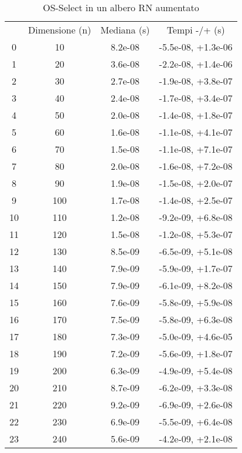 \begin{table}
\centering
\caption{OS-Select in un albero RN aumentato}
\label{OS-Select in un albero RN aumentato}
\begin{adjustbox}{width=1\textwidth/2}
\begin{tabular}{|c|c|c|c|}
\hline
 & Dimensione (n) & Mediana (s) & Tempi -/+ (s) \\
0 & 10 & 8.2e-08 & -5.5e-08, +1.3e-06 \\
\cline{1-4}
1 & 20 & 3.6e-08 & -2.2e-08, +1.4e-06 \\
\cline{1-4}
2 & 30 & 2.7e-08 & -1.9e-08, +3.8e-07 \\
\cline{1-4}
3 & 40 & 2.4e-08 & -1.7e-08, +3.4e-07 \\
\cline{1-4}
4 & 50 & 2.0e-08 & -1.4e-08, +1.8e-07 \\
\cline{1-4}
5 & 60 & 1.6e-08 & -1.1e-08, +4.1e-07 \\
\cline{1-4}
6 & 70 & 1.5e-08 & -1.1e-08, +7.1e-07 \\
\cline{1-4}
7 & 80 & 2.0e-08 & -1.6e-08, +7.2e-08 \\
\cline{1-4}
8 & 90 & 1.9e-08 & -1.5e-08, +2.0e-07 \\
\cline{1-4}
9 & 100 & 1.7e-08 & -1.4e-08, +2.5e-07 \\
\cline{1-4}
10 & 110 & 1.2e-08 & -9.2e-09, +6.8e-08 \\
\cline{1-4}
11 & 120 & 1.5e-08 & -1.2e-08, +5.3e-07 \\
\cline{1-4}
12 & 130 & 8.5e-09 & -6.5e-09, +5.1e-08 \\
\cline{1-4}
13 & 140 & 7.9e-09 & -5.9e-09, +1.7e-07 \\
\cline{1-4}
14 & 150 & 7.9e-09 & -6.1e-09, +8.2e-08 \\
\cline{1-4}
15 & 160 & 7.6e-09 & -5.8e-09, +5.9e-08 \\
\cline{1-4}
16 & 170 & 7.5e-09 & -5.8e-09, +6.3e-08 \\
\cline{1-4}
17 & 180 & 7.3e-09 & -5.0e-09, +4.6e-05 \\
\cline{1-4}
18 & 190 & 7.2e-09 & -5.6e-09, +1.8e-07 \\
\cline{1-4}
19 & 200 & 6.3e-09 & -4.9e-09, +5.4e-08 \\
\cline{1-4}
20 & 210 & 8.7e-09 & -6.2e-09, +3.3e-08 \\
\cline{1-4}
21 & 220 & 9.2e-09 & -6.9e-09, +2.6e-08 \\
\cline{1-4}
22 & 230 & 6.9e-09 & -5.5e-09, +6.4e-08 \\
\cline{1-4}
23 & 240 & 5.6e-09 & -4.2e-09, +2.1e-08 \\

\end{tabular}
\end{adjustbox}
\end{table}
